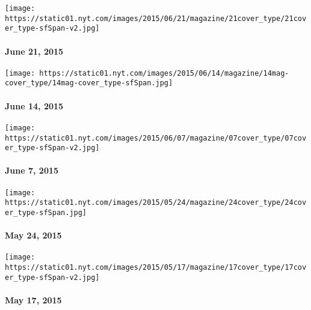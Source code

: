 \href{http://www.nytimes.com/indexes/2015/06/21/magazine/index.html}{}

\texttt{[image: https://static01.nyt.com/images/2015/06/21/magazine/21cover\_type/21cover\_type-sfSpan-v2.jpg]}

\hypertarget{june-21-2015}{%
\paragraph{June 21, 2015}\label{june-21-2015}}

\href{http://www.nytimes.com/indexes/2015/06/14/magazine/index.html}{}

\texttt{[image: https://static01.nyt.com/images/2015/06/14/magazine/14mag-cover\_type/14mag-cover\_type-sfSpan.jpg]}

\hypertarget{june-14-2015}{%
\paragraph{June 14, 2015}\label{june-14-2015}}

\href{http://www.nytimes.com/indexes/2015/06/07/magazine/index.html}{}

\texttt{[image: https://static01.nyt.com/images/2015/06/07/magazine/07cover\_type/07cover\_type-sfSpan-v2.jpg]}

\hypertarget{june-7-2015}{%
\paragraph{June 7, 2015}\label{june-7-2015}}

\href{http://www.nytimes.com/indexes/2015/05/24/magazine/index.html}{}

\texttt{[image: https://static01.nyt.com/images/2015/05/24/magazine/24cover\_type/24cover\_type-sfSpan.jpg]}

\hypertarget{may-24-2015}{%
\paragraph{May 24, 2015}\label{may-24-2015}}

\href{http://www.nytimes.com/indexes/2015/05/17/magazine/index.html}{}

\texttt{[image: https://static01.nyt.com/images/2015/05/17/magazine/17cover\_type/17cover\_type-sfSpan-v2.jpg]}

\hypertarget{may-17-2015}{%
\paragraph{May 17, 2015}\label{may-17-2015}}

